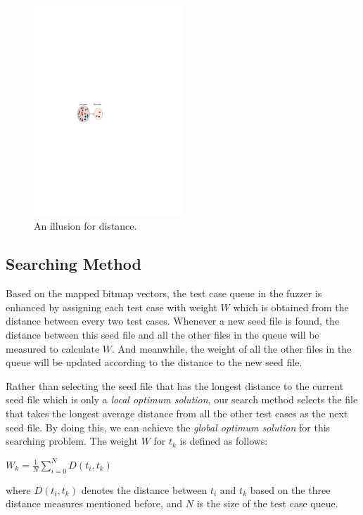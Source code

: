 \begin{figure}
\centering
\includegraphics[width=0.5\textwidth]{figures/distance-illusion.pdf} 
\caption{An illusion for distance.}\label{distance-illusion}
\end{figure}

\subsection{Searching Method}
Based on the mapped bitmap vectors, the test case queue in the fuzzer is enhanced by assigning each test case with weight $W$ which is obtained from the distance between every two test cases. Whenever a new seed file is found, the distance between this seed file and all the other files in the queue will be measured to calculate $W$. And meanwhile, the weight of all the other files in the queue will be updated according to the distance to the new seed file. 


Rather than selecting the seed file that has the longest distance to the current seed file which is only a \emph{local optimum solution}, our search method selects the file that takes the longest average distance from all the other test cases as the next seed file. By doing this, we can achieve the \emph{global optimum solution} for this searching problem. The weight $W$ for $t_k$ is defined as follows:

\begin{center}
$W_k = \displaystyle\frac{1}{N} \sum_{i=0}^{N} D(t_i, t_k)$
\end{center}

where $D(t_i, t_k)$ denotes the distance between $t_i$ and $t_k$ based on the three distance measures mentioned before, and $N$ is the size of the test case queue. 